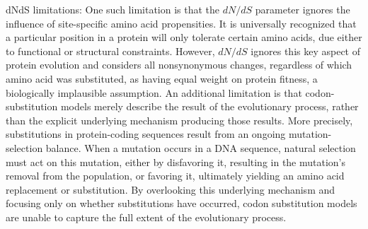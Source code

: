 \documentclass[11pt]{article}
\begin{document}
dNdS limitations:
One such limitation is that the $dN/dS$ parameter ignores the influence of site-specific amino acid propensities.  It is universally recognized that a particular position in a protein will only tolerate certain amino acids, due either to functional or structural constraints. However, $dN/dS$ ignores this key aspect of protein evolution and considers all nonsynonymous changes, regardless of which amino acid was substituted, as having equal weight on protein fitness, a biologically implausible assumption. An additional limitation is that codon-substitution models merely describe the result of the evolutionary process, rather than the explicit underlying mechanism producing those results. More precisely, substitutions in protein-coding sequences result from an ongoing mutation-selection balance. When a mutation occurs in a DNA sequence, natural selection must act on this mutation, either by disfavoring it, resulting in the mutation's removal from the population, or favoring it, ultimately yielding an amino acid replacement or substitution. By overlooking this underlying mechanism and focusing only on whether substitutions have occurred, codon substitution models are unable to capture the full extent of the evolutionary process. 


	
\newpage

	
	
\end{document}
